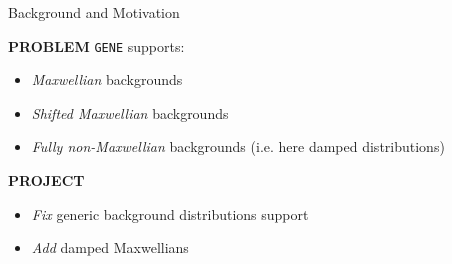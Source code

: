     \begin{frame}{Background and Motivation}
        \begin{alertblock}{\bf PROBLEM}
            {\tt GENE} supports:
            \begin{itemize}
                \item[\bftick]  \emph{Maxwellian} backgrounds
                \item[\ast]  \emph{Shifted Maxwellian} backgrounds
                \item[\bfcross]  \emph{Fully non-Maxwellian} backgrounds (i.e. here damped distributions)
            \end{itemize}
        \end{alertblock}  \pause
        
        \begin{block}{\bf PROJECT}
            \begin{itemize}
                \item  \emph{Fix} generic background distributions support
                \item  \emph{Add} damped Maxwellians
            \end{itemize}
        \end{block}
    \end{frame}